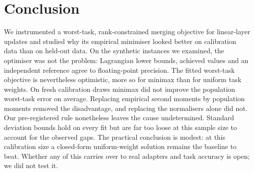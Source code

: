 \section{Conclusion}
\label{sec:conclusion}

We instrumented a worst-task, rank-constrained merging objective for linear-layer updates and
studied why its empirical minimiser looked better on calibration data than on held-out data. On
the synthetic instances we examined, the optimiser was not the problem: Lagrangian lower bounds,
achieved values and an independent reference agree to floating-point precision. The fitted
worst-task objective is nevertheless optimistic, more so for minimax than for uniform task
weights. On fresh calibration draws minimax did not improve the population worst-task error on
average. Replacing empirical second moments by population moments removed the disadvantage, and
replacing the normalisers alone did not. Our pre-registered rule nonetheless leaves the cause
undetermined. Standard deviation bounds hold on every fit but are far too loose at this sample
size to account for the observed gaps. The practical conclusion is modest: at this calibration size a closed-form
uniform-weight solution remains the baseline to beat. Whether any of this carries over to real
adapters and task accuracy is open; we did not test it.
